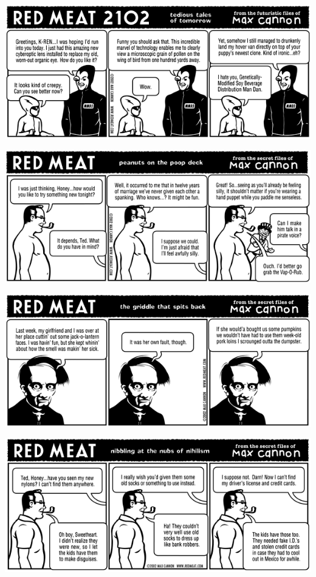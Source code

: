 \documentclass[a4paper,twoside,11pt]{article}
\begin{document}
\includegraphics[width=\textwidth]{redmeat_2002-10-29.png}



\includegraphics[width=\textwidth]{redmeat_2002-11-05.png}



\includegraphics[width=\textwidth]{redmeat_2002-11-12.png}



\includegraphics[width=\textwidth]{redmeat_2002-11-19.png}
\end{document}
